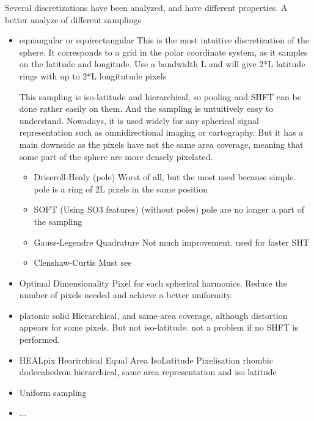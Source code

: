 \documentclass[11pt]{report}
\begin{document}
Several discretizations have been analyzed, and have different properties.
A better analyze of different samplings \cite{elahi_comparative_2016}
\begin{itemize}
    \item equiangular or equirectangular %
    This is the most intuitive discretization of the sphere. It corresponds to a grid in the polar coordinate system, as it samples on the latitude and longitude.
    Use a bandwidth L and will give 2*L latitude rings with up to 2*L longitutude pixels
    
    This sampling is iso-latitude and hierarchical, so pooling and SHFT can be done rather easily on them. And the sampling is untuitively easy to understand. Nowadays, it is used widely for any spherical signal representation such as omnidirectional imaging or cartography. But it has a main downside as the pixels have not the same area coverage, meaning that some part of the sphere are more densely pixelated.
    \begin{itemize}
        \item Driscroll-Healy (pole)\cite{driscoll_computing_1994} %
        Worst of all, but the most used because simple.
        pole is a ring of 2L pixels in the same position
        \item SOFT (Using SO3 features) (without poles)\cite{healy_ffts_2003} %
        pole are no longer a part of the sampling
        \item Gauss-Legendre Quadrature \cite{keiner_fast_2008}
        Not much improvement. used for faster SHT
        \item Clenshaw-Curtis \cite{gimbutas_fast_2013}
        Must see 
    \end{itemize}
    \item Optimal Dimensionality \cite{elahi_comparative_2016} %
    Pixel for each spherical harmonics. Reduce the number of pixels needed and achieve a better uniformity.
    \item platonic solid %
    Hierarchical, and same-area coverage, although distortion appears for some pixels. But not iso-latitude. not a problem if no SHFT is performed.
    \item HEALpix \cite{noauthor_healpix_nodate}
    Hearirchical Equal Area IsoLatitude Pixelisation
    rhombic dodecahedron
    hierarchical, same area representation and iso latitude
    \item Uniform sampling
    \item ...
\end{itemize}
\end{document}
